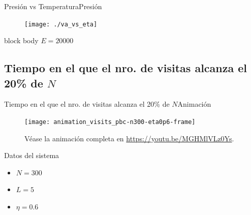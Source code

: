 \documentclass{beamer}
\begin{document}
            \begin{frame}{Presión vs Temperatura}{Presión}
                \begin{figure}[H!]
                    \texttt{[image: ./va\_vs\_eta]}
                    \label{fig:p_vs_t}
                \end{figure}
                \begin{beamercolorbox}[sep=5pt,center]{block body}
                    \small{$E=20000$}
                \end{beamercolorbox}
            \end{frame}

        \subsection{Tiempo en el que el nro. de visitas alcanza el 20\% de $N$}

            \begin{frame}{Tiempo en el que el nro. de visitas alcanza el 20\% de $N$}{Animación}
                \begin{minipage}[t]{0.60\textwidth}
                    \begin{figure}[H!]
                        \texttt{[image: animation\_visits\_pbc-n300-eta0p6-frame]}
                        \caption*{Véase la animación completa en \url{https://youtu.be/MGHMlVLz0Ys}.}
                        \label{fig:pbc_1}
                    \end{figure}
                \end{minipage}
                \hfill
                \begin{minipage}[t]{0.30\textwidth}
                    \begin{block}{Datos del sistema}
                        \begin{itemize}
                            \item $N=300$
                            \item $L=5$
                            \item $\eta=0.6$
                        \end{itemize}
                    \end{block}
                \end{minipage}
            \end{frame}
\end{document}
